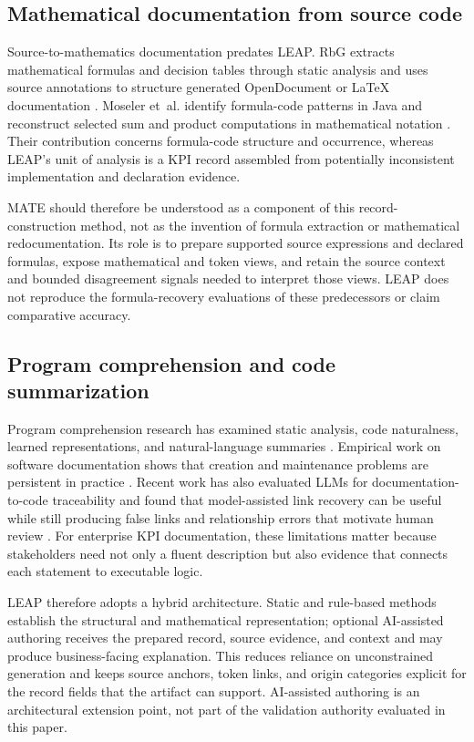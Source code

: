 \documentclass[a4paper,fleqn]{cas-dc}
\newcommand{\tool}{\textsc{LEAP}}
\begin{document}
\subsection{Mathematical documentation from source code}

Source-to-mathematics documentation predates LEAP. RbG extracts mathematical formulas and decision tables through static analysis and uses source annotations to structure generated OpenDocument or LaTeX documentation \citep{Moser2015}. Moseler et~al. identify formula-code patterns in Java and reconstruct selected sum and product computations in mathematical notation \citep{Moseler2021}. Their contribution concerns formula-code structure and occurrence, whereas LEAP's unit of analysis is a KPI record assembled from potentially inconsistent implementation and declaration evidence.

MATE should therefore be understood as a component of this record-construction method, not as the invention of formula extraction or mathematical redocumentation. Its role is to prepare supported source expressions and declared formulas, expose mathematical and token views, and retain the source context and bounded disagreement signals needed to interpret those views. LEAP does not reproduce the formula-recovery evaluations of these predecessors or claim comparative accuracy.

\subsection{Program comprehension and code summarization}

Program comprehension research has examined static analysis, code naturalness, learned representations, and natural-language summaries \citep{Allamanis2018}. Empirical work on software documentation shows that creation and maintenance problems are persistent in practice \citep{Aghajani2019}. Recent work has also evaluated LLMs for documentation-to-code traceability and found that model-assisted link recovery can be useful while still producing false links and relationship errors that motivate human review \citep{Alor2026}. For enterprise KPI documentation, these limitations matter because stakeholders need not only a fluent description but also evidence that connects each statement to executable logic.

\tool{} therefore adopts a hybrid architecture. Static and rule-based methods establish the structural and mathematical representation; optional AI-assisted authoring receives the prepared record, source evidence, and context and may produce business-facing explanation. This reduces reliance on unconstrained generation and keeps source anchors, token links, and origin categories explicit for the record fields that the artifact can support. AI-assisted authoring is an architectural extension point, not part of the validation authority evaluated in this paper.
\end{document}
